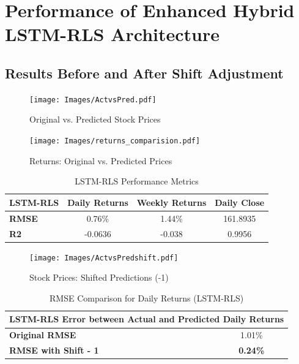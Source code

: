 \section{Performance of Enhanced Hybrid LSTM-RLS Architecture}

\subsection{Results Before and After Shift Adjustment}

\begin{figure}[h!]
    \centering
    \texttt{[image: Images/ActvsPred.pdf]}
    \caption{Original vs. Predicted Stock Prices}
    \label{fig:refinedApproachRes1}
\end{figure}

\begin{figure}[h!]
    \centering
    \texttt{[image: Images/returns\_comparision.pdf]}
    \caption{Returns: Original vs. Predicted Prices}
    \label{fig:refinedApproachRes2}
\end{figure}

\begin{table}[h!]
\centering
\caption{LSTM-RLS Performance Metrics}
\begin{tabular}{|l|c|c|c|}
\hline
\textbf{LSTM-RLS}  & \textbf{Daily Returns} & \textbf{Weekly Returns} & \textbf{Daily Close} \\ \hline
\textbf{RMSE}      & 0.76\%                 & 1.44\%                 & 161.8935             \\ \hline
\textbf{R2}        & -0.0636                & -0.038                 & 0.9956               \\ \hline
\end{tabular}

\label{tab:lstm_rls_performance}
\end{table}

\begin{figure}[h!]
    \centering
    \texttt{[image: Images/ActvsPredshift.pdf]}
    \caption{Stock Prices: Shifted Predictions (-1)}
    \label{fig:revisedApproachshift1}
\end{figure}

\begin{table}[h!]
\centering
\caption{RMSE Comparison for Daily Returns (LSTM-RLS)}
\begin{tabular}{|l|c|}
\hline
\multicolumn{2}{|c|}{\textbf{LSTM-RLS Error between Actual and Predicted Daily Returns}} \\ \hline
\textbf{Original RMSE}       & 1.01\%   \\ \hline
\textbf{RMSE with Shift - 1} & \textbf{0.24\%} \\ \hline
\end{tabular}

\label{tab:lstm_rls_shift}
\end{table}

